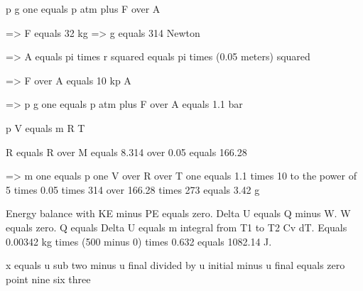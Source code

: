 p g one equals p atm plus F over A

=> F equals 32 kg => g equals 314 Newton

=> A equals pi times r squared equals pi times (0.05 meters) squared

=> F over A equals 10 kp A

=> p g one equals p atm plus F over A equals 1.1 bar

p V equals m R T

R equals R over M equals 8.314 over 0.05 equals 166.28

=> m one equals p one V over R over T one equals 1.1 times 10 to the power of 5 times 0.05 times 314 over 166.28 times 273 equals 3.42 g

Energy balance with KE minus PE equals zero.  
Delta U equals Q minus W.  
W equals zero.  
Q equals Delta U equals m integral from T1 to T2 Cv dT.  
Equals 0.00342 kg times (500 minus 0) times 0.632 equals 1082.14 J.

x equals u sub two minus u final divided by u initial minus u final equals zero point nine six three
